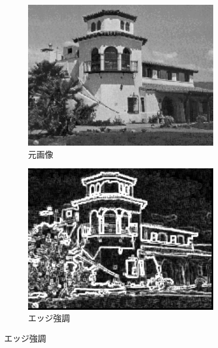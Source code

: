 \documentclass[a4paper,12pt]{jsarticle}
\begin{document}
\begin{figure}[!htbp]
\centering
\begin{subfigure}[b]{0.45\textwidth}
    \centering
    \includegraphics[width=0.9\textwidth]{./sampleimages/sample3.png}
    \caption{元画像}
\end{subfigure}
\hfill
\begin{subfigure}[b]{0.45\textwidth}
    \centering
    \includegraphics[width=0.9\textwidth]{./images/edge_enhanced_sample3_edge.png}
    \caption{エッジ強調}
\end{subfigure}


\end{figure}
\end{document}

